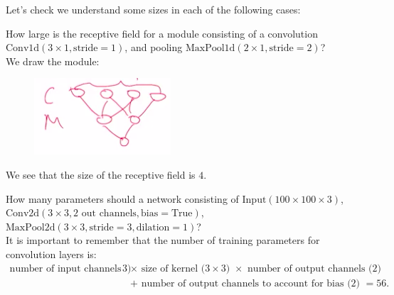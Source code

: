 \minirule

Let's check we understand some sizes in each of the following cases:
\begin{frameex}
How large is the receptive field for a module consisting of a convolution $\textrm{Conv1d}(3 \times 1, \text{stride}=1)$, and pooling $\textrm{MaxPool1d}(2 \times 1, \text{stride}=2)$?\\

We draw the module:
\begin{figure}[H]
\centering
\includegraphics[scale=0.4]{receptivefield.png}
\end{figure}
We see that the size of the receptive field is $4$.
\end{frameex}

\begin{frameex}
How many parameters should a network consisting of $\textrm{Input}(100 \times 100 \times 3)$, $\textrm{Conv2d}(3 \times 3, 2 \text{ out channels}, \text{bias}=\text{True})$, $\textrm{MaxPool2d}(3 \times 3, \text{stride}=3, \text{dilation}=1)$?\\

It is important to remember that the number of training parameters for convolution layers is:
\begin{align*}
\text{number of input channels ($3$) } &\times \text{ size of kernel ($3 \times 3$) } \times \text{ number of output channels ($2$) }\\[1.5ex]
&+ \text{ number of output channels to account for bias ($2$) } = 56.
\end{align*}
\end{frameex}




\newpage
